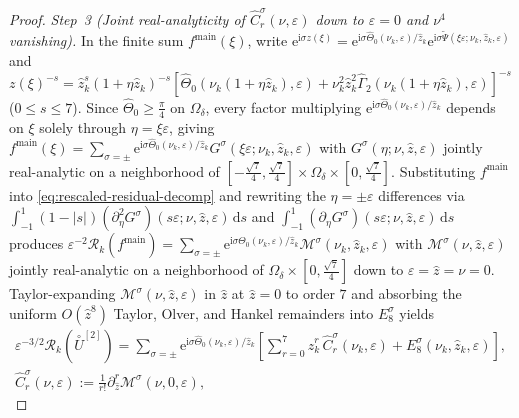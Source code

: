 \documentclass[11pt]{article}
\theoremstyle{definition}
\theoremstyle{remark}
\newcommand{\dd}{\mathrm{d}}
\newcommand{\ii}{\mathrm{i}}
\newcommand{\cR}{\mathcal{R}}
\renewcommand{\_}{\oldunderscore\penalty0\hskip0pt\relax}
\begin{document}
\begin{proof}
\emph{Step~3 (Joint real-analyticity of $\widehat{C}_r^\sigma(\nu,\varepsilon)$ down to $\varepsilon=0$ and $\nu^4$ vanishing).}
In the finite sum $f^{\mathrm{main}}(\xi)$, write $\mathrm{e}^{\ii\sigma
  z(\xi)}=\mathrm{e}^{\ii\sigma\widehat{\Theta}_0(\nu_k,\varepsilon)/\hat{z}_k}\mathrm{e}^{\ii\sigma\widetilde{\Psi}(\xi\varepsilon;\nu_k,\hat{z}_k,\varepsilon)}$
  and
  $z(\xi)^{-s}=\hat{z}_k^s(1+\eta\hat{z}_k)^{-s}[\widehat{\Theta}_0(\nu_k(1+\eta\hat{z}_k),\varepsilon)+\nu_k^2\hat{z}_k^2\widehat{\Gamma}_2(\nu_k(1+\eta\hat{z}_k),\varepsilon)]^{-s}$
  ($0\le s\le 7$). Since $\widehat{\Theta}_0\ge\frac{\pi}{4}$ on $\Omega_\delta$, every factor multiplying
  $\mathrm{e}^{\ii\sigma\widehat{\Theta}_0(\nu_k,\varepsilon)/\hat{z}_k}$ depends on $\xi$ solely through $\eta=\xi\varepsilon$,
  giving
  $f^{\mathrm{main}}(\xi)=\sum_{\sigma=\pm}\mathrm{e}^{\ii\sigma\widehat{\Theta}_0(\nu_k,\varepsilon)/\hat{z}_k}G^\sigma(\xi\varepsilon;\nu_k,\hat{z}_k,\varepsilon)$
  with $G^\sigma(\eta;\nu,\hat{z},\varepsilon)$ jointly real-analytic on a neighborhood of
  $[-\frac{\sqrt{7}}{4},\frac{\sqrt{7}}{4}]\times\Omega_\delta\times[0,\frac{\sqrt{7}}{4}]$. Substituting $f^{\mathrm{main}}$
  into \eqref{eq:rescaled-residual-decomp} and rewriting the $\eta=\pm\varepsilon$ differences via
  $\int_{-1}^1(1-|s|)(\partial_\eta^2 G^\sigma)(s\varepsilon;\nu,\hat{z},\varepsilon)\,\dd s$ and $\int_{-1}^1(\partial_\eta
  G^\sigma)(s\varepsilon;\nu,\hat{z},\varepsilon)\,\dd s$ produces
  $\varepsilon^{-2}\cR_k(f^{\mathrm{main}})=\sum_{\sigma=\pm}\mathrm{e}^{\ii\sigma\widehat{\Theta}_0(\nu_k,\varepsilon)/\hat{z}_k}\mathcal{M}^\sigma(\nu_k,\hat{z}_k,\varepsilon)$
  with $\mathcal{M}^\sigma(\nu,\hat{z},\varepsilon)$ jointly real-analytic on a neighborhood of
  $\Omega_\delta\times[0,\frac{\sqrt{7}}{4}]$ down to $\varepsilon=\hat{z}=\nu=0$. Taylor-expanding
  $\mathcal{M}^\sigma(\nu,\hat{z},\varepsilon)$ in $\hat{z}$ at $\hat{z}=0$ to order $7$ and absorbing the uniform $O(\hat{z}^8)$
  Taylor, Olver, and Hankel remainders into $E_8^\sigma$ yields
\begin{equation}
  \begin{gathered}
  \varepsilon^{-3/2}\cR_k(\stackrel{\circ}{U}^{[2]}) =
    \sum_{\sigma=\pm}\mathrm{e}^{\ii\sigma\widehat{\Theta}_0(\nu_k,\varepsilon)/\hat{z}_k}\left[\sum_{r=0}^7\hat{z}_k^r\,\widehat{C}_r^\sigma(\nu_k,\varepsilon)
    + E_8^\sigma(\nu_k,\hat{z}_k,\varepsilon)\right],\\
  \widehat{C}_r^\sigma(\nu,\varepsilon) := \frac{1}{r!}\partial_{\hat{z}}^r\mathcal{M}^\sigma(\nu,0,\varepsilon),
  \end{gathered}

\end{equation}
\end{proof}
\end{document}
